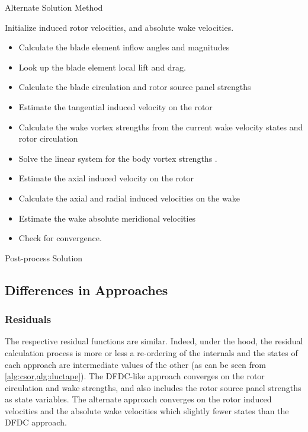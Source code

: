 \begin{algorithm}
\caption{Alternate Solution Method}\label{alg:ductape}
\begin{algorithmic}
\State Initialize induced rotor velocities, and absolute wake velocities.
\begin{itemize}
    \renewcommand\labelitemi{\(\cdot\)}
    \setlength{\itemindent}{1em}
    \item Calculate the blade element inflow angles and magnitudes 
    \item Look up the blade element local lift and drag.
    \item Calculate the blade circulation and rotor source panel strengths 
    \item Estimate the tangential induced velocity on the rotor 
    \item Calculate the wake vortex strengths from the current wake velocity states and rotor circulation 
    \item Solve the linear system for the body vortex strengths .
    \item Estimate the axial induced velocity on the rotor 
    \item Calculate the axial and radial induced velocities on the wake 
    \item Estimate the wake absolute meridional velocities 
    \item Check for convergence.
\end{itemize}
\EndWhile
\State Post-process Solution
\end{algorithmic}
\end{algorithm}

\subsection{Differences in Approaches}

\subsubsection{Residuals}

The respective residual functions are similar.
%
Indeed, under the hood, the residual calculation process is more or less a re-ordering of the internals and the states of each approach are intermediate values of the other (as can be seen from \cref{alg:csor,alg:ductape}).
%
%
The DFDC-like approach converges on the rotor circulation and wake strengths, and also includes the rotor source panel strengths as state variables.
%
The alternate approach converges on the rotor induced velocities and the absolute wake velocities which slightly fewer states than the DFDC approach.

